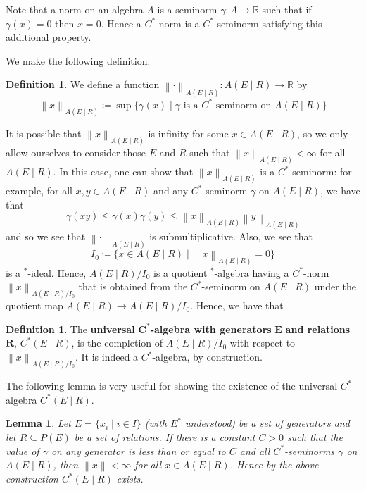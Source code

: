 \documentclass{article}
\theoremstyle{plain}
\newtheorem{lemma}[theorem]{Lemma}
\theoremstyle{definition}
\newtheorem{definition}[theorem]{Definition}
\theoremstyle{remark}
\newcommand{\norm}[1]{\left\lVert#1\right\rVert}
\begin{document}
Note that a norm on an algebra $A$ is a seminorm $\gamma : A \rightarrow \mathbb{R}$ 
such that if $\gamma(x) = 0$ then $x = 0$.
Hence a $C^*$-norm is a $C^*$-seminorm satisfying this additional property.

We make the following definition.

\begin{definition}
	We define a function $\norm{\cdot}_{A(E \mid R)} : A(E \mid R) \rightarrow \mathbb{R}$ by
	\begin{equation}
		\norm{x}_{A(E \mid R)} 
		\coloneqq
		\sup\{\gamma(x) \mid \gamma \text{ is a } C^*\text{-seminorm on } A(E \mid R)\}
	\end{equation}
\end{definition}
It is possible that 
$\norm{x}_{A(E \mid R)}$ is infinity for some $x \in A(E \mid R)$,
so we only allow ourselves to consider those $E$ and $R$ such that
$\norm{x}_{A(E \mid R)} < \infty$ for all $A(E \mid R)$.
In this case, one can show that $\norm{x}_{A(E \mid R)}$ is a $C^*$-seminorm:
for example, for all $x, y \in A(E \mid R)$ and any $C^*$-seminorm 
$\gamma$ on $A(E \mid R)$, we have that
\begin{equation}
	\gamma(xy) \leq \gamma(x)\gamma(y) \leq \norm{x}_{A(E \mid R)}\norm{y}_{A(E \mid R)}  
\end{equation}
and so we see that $\norm{\cdot}_{A(E \mid R)}$ is submultiplicative.
Also, we see that 
\begin{equation}
	I_0 \coloneqq \{x \in A(E \mid R) \mid \norm{x}_{A(E \mid R)} = 0\}
\end{equation}
is a $^*$-ideal.
Hence, $A(E \mid R)/I_0$ is a quotient $^*$-algebra having a $C^*$-norm
$\norm{x}_{A(E \mid R)/I_0}$
that is obtained from the $C^*$-seminorm on $A(E \mid R)$ 
under the quotient map $A(E \mid R) \rightarrow A(E \mid R)/I_0$.
Hence, we have that

\begin{definition}
	The \textbf{universal} $\bm{C^*}$\textbf{-algebra
	with generators} $\bm{E}$ \textbf{and relations} $\bm{R}$,
	$C^*(E \mid R)$,
	is the completion of $A(E \mid R)/I_0$ 
	with respect to $\norm{x}_{A(E \mid R)/I_0}$.
	It is indeed a $C^*$-algebra, by construction.
\end{definition}

The following lemma is very useful for showing the existence of the universal 
$C^*$-algebra $C^*(E \mid R)$.

\begin{lemma} \label{uniCstarexist}
	Let $E = \{x_i \mid i \in I\}$ (with $E^*$ understood)
	be a set of generators and let $R \subseteq P(E)$ be a set of relations.
	If there is a constant $C > 0$ such that the value of $\gamma$ on any
	generator is less than or equal to $C$
	and all $C^*$-seminorms $\gamma$ on $A(E \mid R)$, then $\norm{x} < \infty$
	for all $x \in A(E \mid R)$.
	Hence by the above construction $C^*(E \mid R)$ exists.
\end{lemma}
\end{document}
